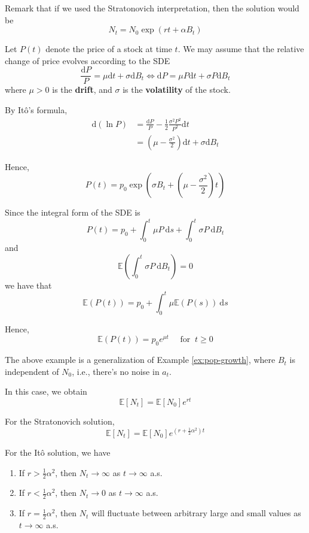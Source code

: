 Remark that if we used the Stratonovich interpretation, then the solution would be
\[
    N_t = N_0 \exp (rt + \alpha B_t)
\]

\begin{example}
    Let $P(t)$ denote the price of a stock at time $t$. We may assume that the relative change of price evolves according to the SDE 
    \[
        \frac{\mathrm{d} P}{P} = \mu \mathrm{d}t + \sigma \mathrm{d} B_t \iff \mathrm{d} P = \mu P \mathrm{d}t + \sigma P \mathrm{d} B_t
    \]
    where $\mu > 0$ is the \textbf{drift}, and $\sigma$ is the \textbf{volatility} of the stock. 

    By Itô's formula,
    \begin{equation*}
        \begin{aligned}
            \mathrm{d}(\ln P) &= \frac{\mathrm{d} P}{P} - \frac{1}{2} \frac{\sigma^2 P^2}{P^2} \mathrm{d}t \\
            &= \left( \mu - \frac{\sigma^2}{2} \right) \mathrm{d}t + \sigma \mathrm{d} B_t
        \end{aligned}
    \end{equation*}

    Hence,
    \[
        P(t) = p_0 \exp \left( \sigma B_t + \left( \mu - \frac{\sigma^2}{2} \right) t \right)
    \]

    Since the integral form of the SDE is 
    \[
        P(t) = p_0 + \int_0^t \mu P~\mathrm{d}s + \int_0^t \sigma P~\mathrm{d}B_t
    \]
    and 
    \[
        \mathbb{E} \left( \int_0^t \sigma P ~\mathrm{d}B_t \right) = 0  
    \]
    we have that
    \[
        \mathbb{E}(P(t)) = p_0 + \int_0^t \mu \mathbb{E}(P(s))~\mathrm{d}s
    \]

    Hence, 
    \[
        \mathbb{E}(P(t)) = p_0 e^{\mu t} \quad \text{ for } ~ t \geq 0
    \]
\end{example}

The above example is a generalization of Example \ref{ex:pop-growth}, where $B_t$ is independent of $N_0$, i.e., there's no noise in $a_t$. 

In this case, we obtain
\[
    \mathbb{E}[N_t] = \mathbb{E}[N_0] e^{rt}
\]

For the Stratonovich solution,
\[
    \mathbb{E}[N_t] = \mathbb{E}[N_0] e^{\left( r+\frac{1}{2} \alpha^2 \right) t}
\]

For the Itô solution, we have 
\begin{enumerate}
    \item If $r > \frac{1}{2} \alpha^2$, then $N_t \to \infty$ as $t \to \infty$ a.s.
    \item If $r < \frac{1}{2} \alpha^2$, then $N_t \to 0$ as $t \to \infty$ a.s.
    \item If $r = \frac{1}{2} \alpha^2$, then $N_t$ will fluctuate between arbitrary large and small values as $t \to \infty$ a.s.
\end{enumerate}

